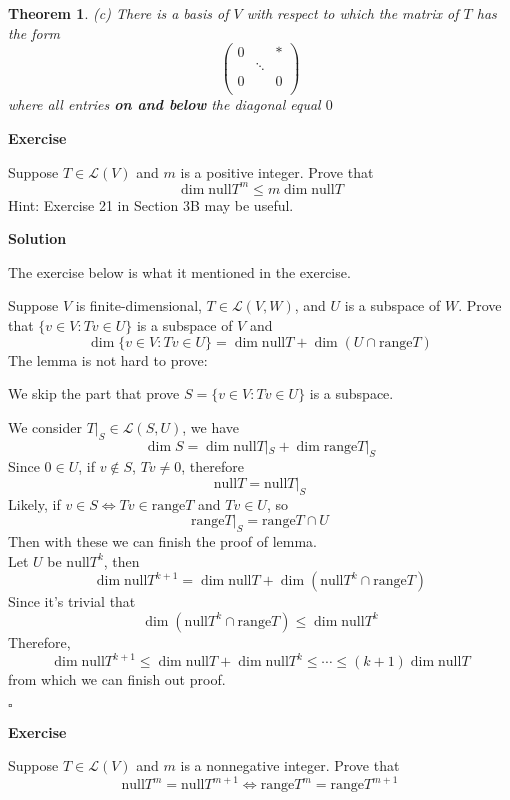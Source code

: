 \documentclass{article}
\newtheorem{theorem}{Theorem}[subsection]
\newenvironment{exercise}{%
{\textbf{Exercise\\}
    }
}{
}
\newenvironment{solution}{%
{
    \textbf{Solution\\}
    }
}{
  \hfill $\square$ 
  \par\bigskip 
}
\newcommand{\range}{\text{range}}
\newcommand{\n}{\text{null}}
\begin{document}
\begin{CJK}{UTF8}{gkai}
\begin{theorem}
    (c) There is a basis of $V$ with respect to which the matrix of $T$ has the form
    \[\begin{pmatrix}
        0&&\ast\\
        &\ddots&\\
        0&&0\\
    \end{pmatrix}\]
    where all entries \textbf{on and below} the diagonal equal $0$
\end{theorem}

\begin{exercise}
    Suppose $T \in \mathcal{L}(V)$ and $m$ is a positive integer. Prove that
    \[\dim \n T^m \leq m \dim \n T\]
    Hint: Exercise 21 in Section 3B may be useful.
\end{exercise}

\begin{solution}
    The exercise below is what it mentioned in the exercise.

    Suppose $V$ is finite-dimensional, $T \in \mathcal{L}(V ,W)$, and $U$ is a subspace of $W$. Prove that $\{v \in V  : Tv \in U\}$ is a subspace of $V$ and
    \[\dim\{v \in V  : Tv \in U\} = \dim \n T + \dim (U \cap \range T)\]
    The lemma is not hard to prove:

    We skip the part that prove $S = \{v \in V  : Tv \in U\}$ is a subspace.

    We consider $T|_S \in \mathcal{L}(S,U)$, we have
    \[\dim S = \dim \n T|_S + \dim \range T|_S\]
    Since $0 \in U$, if $v \notin S$, $Tv \neq 0$, therefore
    \[\n T = \n T|_S\]
    Likely, if $v \in S \Leftrightarrow Tv \in \range T$ and $Tv \in U$, so
    \[\range T|_S = \range T \cap U\]
    Then with these we can finish the proof of lemma.\\

    Let $U$ be $\n T^k$, then
    \[\dim \n T^{k + 1} = \dim \n T + \dim (\n T^k \cap \range T)\]
    Since it's trivial that 
    \[\dim (\n T^k \cap \range T) \leq \dim \n T^k \]
    Therefore,
    \[\dim \n T^{k + 1} \leq \dim \n T + \dim \n T^k \leq \cdots \leq (k + 1)\dim \n T\]
    from which we can finish out proof.
\end{solution}

\begin{exercise}
    Suppose $T \in \mathcal{L}(V)$ and $m$ is a nonnegative integer. Prove that
    \[\n T^m = \n T^{m+1} \Leftrightarrow \range T^m = \range T^{m+1}\]
\end{exercise}


\end{CJK}
\end{document}
